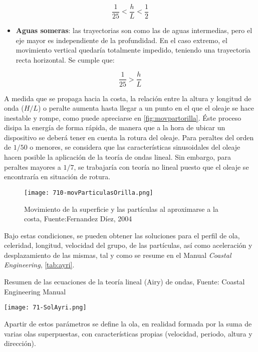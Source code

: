 \[\frac{1}{25}<\frac{h}{L}<\frac{1}{2}\]

\begin{itemize}
\item
  \textbf{Aguas someras}: las trayectorias son como las de aguas
  intermedias, pero el eje mayor es independiente de la profundidad. En
  el caso extremo, el movimiento vertical quedaría totalmente impedido,
  teniendo una trayectoria recta horizontal. Se cumple que:
\end{itemize}

\[\frac{1}{25}>\frac{h}{L}\]

A medida que se propaga hacia la costa, la relación entre la altura y
longitud de onda ($H/L$) o peralte aumenta hasta llegar a un punto en el
que el oleaje se hace inestable y rompe, como puede apreciarse en \autoref{fig:movpartorilla}. Éste proceso disipa la energía
de forma rápida, de manera que a la hora de ubicar un dispositivo se
deberá tener en cuenta la rotura del oleaje. Para peraltes del orden de
$1/50$ o menores, se considera que las características sinusoidales del
oleaje hacen posible la aplicación de la teoría de ondas lineal. Sin
embargo, para peraltes mayores a $1/7$, se trabajaría con teoría no lineal
puesto que el oleaje se encontraría en situación de rotura.

\begin{figure}
\centering
\texttt{[image: 710-movParticulasOrilla.png]}
\caption[Movimiento de las partículas]{Movimiento de la superficie y las partículas al aproximarse a la costa, Fuente:Fernandez Díez, 2004}
\label{fig:movpartorilla}
\end{figure}

Bajo estas condiciones, se pueden obtener las soluciones para el perfil
de ola, celeridad, longitud, velocidad del grupo, de las partículas, así
como aceleración y desplazamiento de las mismas, tal y como se resume en
el Manual \emph{Coastal Engineering}, \autoref{tab:ayri}.

\begin{table}
\centering
\caption[Teoría Airy]{Resumen de las ecuaciones de la teoría lineal (Airy) de ondas, Fuente: Coastal Engineering Manual}
\texttt{[image: 71-SolAyri.png]}
\label{tab:ayri}
\end{table}

Apartir de estos parámetros se define la ola, en realidad formada por la
suma de varias olas superpuestas, con características propias
(velocidad, periodo, altura y dirección).

